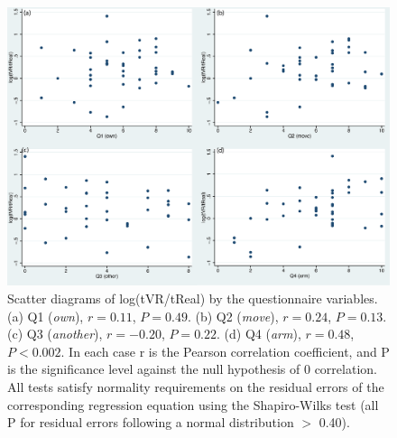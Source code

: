 \documentclass[
		twoside,openright,titlepage,numbers=noenddot,manychapters,
		headinclude,%
                footinclude=false,cleardoublepage=empty,
                BCOR=5mm,
		fontsize=11pt, %
                 enabledeprecatedfontcommands]{scrreprt}
\begin{document}
\begin{figure}[]

\begin{center}

\includegraphics[width=12cm]{figures/sens/Figure6.eps}
\caption{
Scatter diagrams of log(tVR/tReal) by the questionnaire variables. 
(a) Q1 (\emph{own}), $r = 0.11$, $P = 0.49$. (b) Q2 (\emph{move}), $r = 0.24$, $P = 0.13$.   (c) Q3 (\emph{another}),        $r = -0.20$, $P = 0.22$. (d) Q4 (\emph{arm}), $r = 0.48$, $P < 0.002$. In each case r is the Pearson correlation coefficient, and P is the significance level against the null hypothesis of 0 correlation. All tests satisfy normality requirements on the residual errors of the corresponding regression equation using the Shapiro-Wilks test (all P for residual errors following a normal distribution $>$ 0.40).  }
\label{sens6}

\end{center}

\end{figure} 
\end{document}
